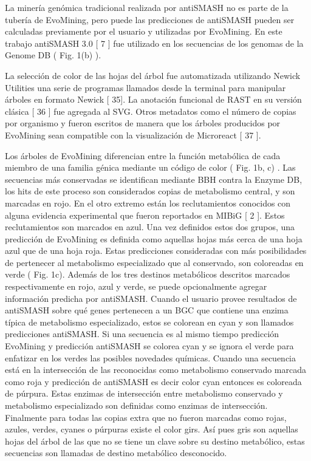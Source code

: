 \documentclass[12pt,twoside]{reedthesis}
\begin{document}
  La minería genómica tradicional realizada por antiSMASH no es parte de
  la tubería de EvoMining, pero puede las predicciones de antiSMASH pueden
  ser calculadas previamente por el usuario y utilizadas por EvoMining. En
  este trabajo antiSMASH 3.0 {[} 7 {]} fue utilizado en los secuencias de
  los genomas de la Genome DB ( Fig. 1(b) ).
  
  La selección de color de las hojas del árbol fue automatizada utilizando
  Newick Utilities una serie de programas llamados desde la terminal para
  manipular árboles en formato Newick {[} 35{]}. La anotación funcional de
  RAST en su versión clásica {[} 36 {]} fue agregada al SVG. Otros
  metadatos como el número de copias por organismo y fueron escritos de
  manera que los árboles producidos por EvoMining sean compatible con la
  visualización de Microreact {[} 37 {]}.
  
  Los árboles de EvoMining diferencian entre la función metabólica de cada
  miembro de una familia génica mediante un código de color ( Fig. 1b, c)
  . Las secuencias más conservadas se identifican mediante BBH contra la
  Enzyme DB, los hits de este proceso son considerados copias de
  metabolismo central, y son marcadas en rojo. En el otro extremo están
  los reclutamientos conocidos con alguna evidencia experimental que
  fueron reportados en MIBiG {[} 2 {]}. Estos reclutamientos son marcados
  en azul. Una vez definidos estos dos grupos, una predicción de EvoMining
  es definida como aquellas hojas más cerca de una hoja azul que de una
  hoja roja. Estas predicciones consideradas con más posibilidades de
  pertenecer al metabolismo especializado que al conservado, son
  coloreadas en verde ( Fig. 1c). Además de los tres destinos metabólicos
  descritos marcados respectivamente en rojo, azul y verde, se puede
  opcionalmente agregar información predicha por antiSMASH. Cuando el
  usuario provee resultados de antiSMASH sobre qué genes pertenecen a un
  BGC que contiene una enzima típica de metabolismo especializado, estos
  se colorean en cyan y son llamados predicciones antiSMASH. Si una
  secuencia es al mismo tiempo predicción EvoMining y predicción antiSMASH
  se colorea cyan y se ignora el verde para enfatizar en los verdes las
  posibles novedades químicas. Cuando una secuencia está en la
  intersección de las reconocidas como metabolismo conservado marcada como
  roja y predicción de antiSMASH es decir color cyan entonces es coloreada
  de púrpura. Estas enzimas de intersección entre metabolismo conservado y
  metabolismo especializado son definidas como enzimas de intersección.
  Finalmente para todas las copias extra que no fueron marcadas como
  rojas, azules, verdes, cyanes o púrpuras existe el color girs. Así pues
  gris son aquellas hojas del árbol de las que no se tiene un clave sobre
  su destino metabólico, estas secuencias son llamadas de destino
  metabólico desconocido.
  
\end{document}
